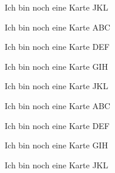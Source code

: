 \documentclass[a6paper,10pt,print]{kartei}
\begin{document}
	\begin{karte}{Ich bin noch eine Karte}
		JKL
	\end{karte}
	\begin{karte}{Ich bin noch eine Karte}
		ABC
	\end{karte}
	\begin{karte}{Ich bin noch eine Karte}
		DEF
	\end{karte}
	\begin{karte}{Ich bin noch eine Karte}
		GIH
	\end{karte}
	\begin{karte}{Ich bin noch eine Karte}
		JKL
	\end{karte}
	\begin{karte}{Ich bin noch eine Karte}
		ABC
	\end{karte}
	\begin{karte}{Ich bin noch eine Karte}
		DEF
	\end{karte}
	\begin{karte}{Ich bin noch eine Karte}
		GIH
	\end{karte}
	\begin{karte}{Ich bin noch eine Karte}
		JKL
	\end{karte}
\end{document}
